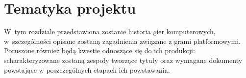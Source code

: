 \documentclass[12pt,a4paper,oneside]{book}
\theoremstyle{definition}
\numberwithin{equation}{chapter}
\begin{document}
\chapter{Tematyka projektu}
\par W~tym rozdziale przedstawiona zostanie historia gier komputerowych, w~szczególności opisane zostaną zagadnienia związane z grami platformowymi. Poruszone również będą kwestie odnoszące się do ich produkcji: scharakteryzowane zostaną zespoły tworzące tytuły oraz wymagane dokumenty powstające w poszczególnych etapach ich powstawania.


\end{document}
